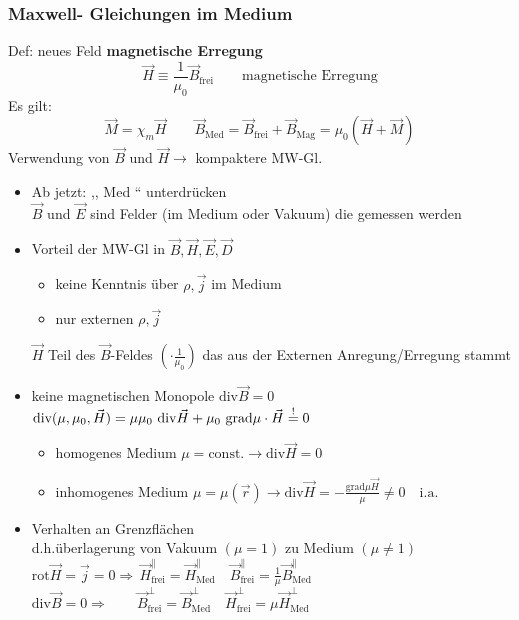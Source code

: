 \documentclass[titlepage,12pt,a4paper,ngerman]{report}
\newcommand{\tx}[1]{\textrm{#1}}
\newcommand{\grad}{\tx{grad}}
\begin{document}
\subsubsection{Maxwell- Gleichungen im Medium}
Def: neues Feld \textbf{magnetische Erregung}
$$ \boxed{\vec{H} \equiv \frac{1}{\mu_0} \vec{B}_{\tx{frei}}} \qquad \tx{magnetische Erregung}$$
Es gilt: $$ \vec{M} = \chi_m \vec{H} \qquad \vec{B}_{\tx{Med}} = \vec{B}_{\tx{frei}}+ \vec{B}_{\tx{Mag}} = \mu_0 (\vec{H} + \vec{M})$$
Verwendung von $ \vec{B} $ und $ \vec{H} \rightarrow $ kompaktere MW-Gl.\\
\begin{itemize}
	\item Ab jetzt: ,, Med `` unterdrücken \\
	$ \vec{B} $ und $ \vec{E} $ sind Felder (im Medium oder Vakuum) die gemessen werden
	\item Vorteil der MW-Gl in $ \vec{B}, \vec{H}, \vec{E}, \vec{D} $
	\begin{itemize}
		\item keine Kenntnis über $ \rho, \vec{j} $ im Medium
		\item nur externen $ \rho, \vec{j} $
	\end{itemize}
	$ \vec{H} $ Teil des $ \vec{B} $-Feldes $ ( \cdot \frac{1}{\mu_0}) $ das aus der Externen Anregung/Erregung stammt
	\item keine magnetischen Monopole $ \tx{div} \vec{B} = 0 $\\
	$ \tx{div}(\mu,\mu_0,\vec{H}) = \mu \mu_0 \tx{ div} \vec{H} + \mu_0 \  \grad \mu \cdot \vec{H} \buildrel ! \over = 0 $
	\begin{itemize}
		\item homogenes Medium $ \mu = \tx{const.}  \rightarrow \tx{div} \vec{H} = 0 $
		\item inhomogenes Medium $ \mu = \mu(\vec{r}) \rightarrow \tx{div} \vec{H} = - \frac{\grad \mu \vec{H}}{\mu} \neq 0 \quad \tx{i.a.} $
	\end{itemize}
	\item Verhalten an Grenzflächen\\
	d.h.überlagerung von Vakuum $ (\mu = 1) $ zu Medium $ (\mu \neq 1) $\\
	$ \tx{rot} \vec{H} = \vec{j} = 0 \Rightarrow \, \vec{H}^{\parallel}_{\tx{frei}} = \vec{H}^{\parallel}_{\tx{Med}} \quad \vec{B}^{\parallel}_{\tx{frei}} = \frac{1}{\mu} \vec{B}^{\parallel}_{\tx{Med}} $\\
	$ \tx{div} \vec{B} = 0 \Rightarrow \quad \quad \vec{B}^{\perp}_{\tx{frei}} = \vec{B}^{\perp}_{\tx{Med}} \quad \vec{H}^{\perp}_{\tx{frei}} = \mu \vec{H}^{\perp}_{\tx{Med}} $
\end{itemize}
\end{document}
